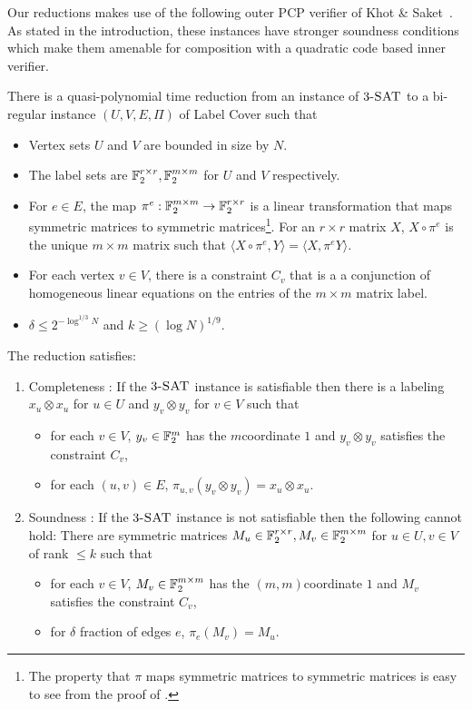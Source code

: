 Our reductions makes use of the following outer PCP verifier of Khot
\& Saket~\cite{KhotS2014b}. As stated in the introduction, these
instances have stronger soundness conditions which make them amenable
for composition with a quadratic code based inner verifier.
\begin{theorem}
\label{thm:quad-label-cover}
There is a quasi-polynomial time reduction from an instance of $\textnormal{$3$\textsc{-SAT}}$ to a bi-regular instance $(U,V,E,\Pi)$ of Label Cover such that 
\begin{itemize}
\item Vertex sets $U$ and $V$ are bounded in size by $N$.
\item The label sets are $\mathbb F_2^{r\times r},\mathbb F_2^{m\times m}$ for $U$ and $V$ respectively.
\item For $e \in E$, the map $\pi^e:\mathbb F_2^{m\times m} \rightarrow \mathbb F_2^{r\times r}$ is a linear transformation that maps symmetric matrices to symmetric matrices\footnote{The property that $\pi$ maps symmetric matrices to symmetric matrices is easy to see from the proof of {\cite[Theorem~7.2]{KhotS2014b}}.}. For an $r\times r$ matrix $X$, $X\circ \pi^e$ is the unique $m \times m$ matrix such that $\langle X \circ \pi^e, Y \rangle = \langle X , \pi^e Y \rangle$.
\item For each vertex $v \in V$, there is a constraint $C_v$ that is a a conjunction of homogeneous linear equations on the entries of the $m \times m$ matrix label.
\item $\delta \leq  2^{- \log^{1/3} N}$ and $k \geq  (\log N)^{1/9}$.
\end{itemize}
The reduction satisfies:
\begin{enumerate}
\item Completeness : If the $\textnormal{$3$\textsc{-SAT}}$ instance is satisfiable then there is a labeling $x_u \otimes x_u$ for $u \in U$ and $y_v \otimes y_v$ for $v\in V$ such that
\begin{itemize}
\item  for each $v \in V$, $y_v \in \mathbb F_2^m$ has the $m$\th coordinate $1$ and $y_v\otimes y_v$ satisfies the constraint $C_v$,
\item  for each $(u,v) \in E$, $\pi_{u,v}(y_v \otimes y_v) = x_u \otimes x_u$.
\end{itemize}

\item Soundness : If the $\textnormal{$3$\textsc{-SAT}}$ instance is not satisfiable then the following cannot hold: There are symmetric matrices $M_u \in \mathbb F_2^{r\times r}, M_v \in \mathbb F_2^{m\times m}$ for $u\in U, v\in V$ of rank $\leq k$ such that 
\begin{itemize}
\item  for each $v \in V$, $M_v \in \mathbb F_2^{m \times m}$ has the $(m,m)$\th coordinate $1$ and $M_v$ satisfies the constraint $C_v$,
\item for $\delta$ fraction of edges $e$, $\pi_e(M_v) = M_u$.
\end{itemize}


\end{enumerate}
\end{theorem}
